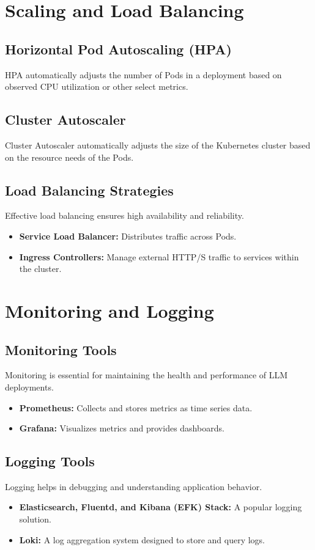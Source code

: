 \section{Scaling and Load Balancing}

\subsection{Horizontal Pod Autoscaling (HPA)}
HPA automatically adjusts the number of Pods in a deployment based on observed CPU utilization or other select metrics.

\subsection{Cluster Autoscaler}
Cluster Autoscaler automatically adjusts the size of the Kubernetes cluster based on the resource needs of the Pods.

\subsection{Load Balancing Strategies}
Effective load balancing ensures high availability and reliability.
\begin{itemize}
    \item \textbf{Service Load Balancer:} Distributes traffic across Pods.
    \item \textbf{Ingress Controllers:} Manage external HTTP/S traffic to services within the cluster.
\end{itemize}

\section{Monitoring and Logging}

\subsection{Monitoring Tools}
Monitoring is essential for maintaining the health and performance of LLM deployments.
\begin{itemize}
    \item \textbf{Prometheus:} Collects and stores metrics as time series data.
    \item \textbf{Grafana:} Visualizes metrics and provides dashboards.
\end{itemize}

\subsection{Logging Tools}
Logging helps in debugging and understanding application behavior.
\begin{itemize}
    \item \textbf{Elasticsearch, Fluentd, and Kibana (EFK) Stack:} A popular logging solution.
    \item \textbf{Loki:} A log aggregation system designed to store and query logs.
\end{itemize}

